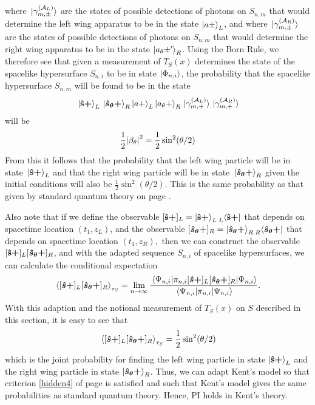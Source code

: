 where $\ket*{\gamma_{m,\pm}^{(\mathcal{A}_L)}}$ are the states of possible detections of photons on $S_{n,m}$ that would determine the left wing apparatus to be in the state $\ket{a\pm}_L$, and where $\ket*{\gamma_{m,\pm}^{(\mathcal{A}_R)}}$ are the states of possible detections of photons on $S_{n,m}$ that would determine the right wing apparatus to be in the state $\ket{a_\theta\pm'}_R$.
Using the Born Rule, we therefore see that given a measurement of $T_S(x)$ determines the state of the spacelike hypersurface $S_{n,i}$ to be in state $\ket{\Phi_{n,i}}$,  the probability that the spacelike hypersurface $S_{n,m}$ will be found to be in the state 
$$\ket*{\vb{\hat{{s}}}\bm{+}}_L\ket*{\bm{\hat{s}_\theta+}}_R\ket{a+}_L\ket{a_\theta+}_R\ket*{\gamma_{m,+}^{(\mathcal{A}_L)}}\ket*{\gamma_{m,+}^{(\mathcal{A}_R)}}$$
will be 
$$\frac{1}{2}\abs{\beta_\theta}^2=\frac{1}{2}\sin^2(\theta/2) $$
From this it follows that the probability that the left wing particle will be in state $\ket*{\vb{\hat{{s}}}\bm{+}}_L$ and that the right wing particle will be in state $\ket*{\bm{\hat{s}_\theta+}}_R$ given the initial conditions will also be $\frac{1}{2}\sin^2(\theta/2) $. This is the same probability as that given by standard quantum theory on page \pageref{bellsin}. 

Also note that if we define the observable $[\vb{\hat{{s}}}\bm{+}]_L=\ket{\vb{\hat{{s}}}\bm{+}}_L\prescript{}{L}{\bra{\vb{\hat{{s}}}\bm{+}}}$ that depends on spacetime location $(t_1, z_L)$, and the observable $[\bm{\hat{s}_\theta+}]_R=\ket{\bm{\hat{s}_\theta+}}_R\prescript{}{R}{\bra{\bm{\hat{s}_\theta+}}}$ that depends on spacetime location $(t_1, z_R),$ then we can construct the observable
$[\vb{\hat{{s}}}\bm{+}]_L [\bm{\hat{s}_\theta+}]_R $, and with the adapted sequence $S_{n,i}$ of spacelike hypersurfaces, we can calculate the conditional expectation
$$\ev*{[\bm{\hat{s}+}]_L[\bm{\hat{s}_\theta+}]_R}_{\tau_S}=\lim_{n\rightarrow\infty}\frac{\ev*{\pi_{n,i}[\bm{\hat{s}+}]_L[\bm{\hat{s}_\theta+}]_R}{\Psi_{n,i}}}{\ev*{\pi_{n,i}}{\Psi_{n,i}}}.$$
With this adaption and the notional measurement of $T_S(x)$ on $S$ described in this section, it is easy to see that 
$$\ev*{[\bm{\hat{s}+}]_L[\bm{\hat{s}_\theta+}]_R}_{\tau_S}=\frac{1}{2}\sin^2(\theta/2)$$ 
which is the joint probability for finding the left wing particle in state $\ket{\vb{\hat{{s}}}\bm{+}}_L$ and the right wing particle in state $\ket{\bm{\hat{s}_\theta+}}_R$. Thus, we can adapt Kent's model so that criterion \ref{hidden4} of page \pageref{hidden4} is satisfied and such that Kent's model gives the same probabilities as standard quantum theory. Hence, PI holds in Kent's theory.\label{kentpiend}


